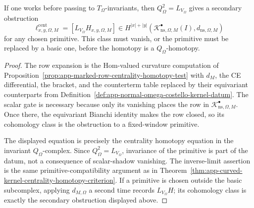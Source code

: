 \begin{prop}
  If one works before passing to \(T_\Omega\)-invariants, then
  \(Q_\Omega^2=L_{V_\Omega}\) gives a secondary obstruction
  \[
    \ell^{\mathrm{cent}}_{x,y,\Omega,M}
      =
    [L_{V_\Omega}H_{x,y,\Omega,M}]
      \in
    H^{|x|+|y|}
      (\mathcal K^\bullet_{\mathrm{ns},\Omega,M}(I),
       d_{\mathrm{ns},\Omega,M})
  \]
  for any chosen primitive.  This class must vanish, or the primitive
  must be replaced by a basic one, before the homotopy is a
  \(Q_\Omega\)-homotopy.
\end{prop}

\begin{proof}
  The row expansion is the Hom-valued curvature computation of
  Proposition~\ref{prop:app-marked-row-centrality-homotopy-test} with
  \(d_M\), the CE differential, the bracket, and the counterterm table
  replaced by their equivariant counterparts from
  Definition~\ref{def:app-normal-omega-costello-kernel-datum}.  The
  scalar gate is necessary because only its vanishing places the row in
  \(\mathcal K^\bullet_{\mathrm{ns},\Omega,M}\).  Once there, the
  equivariant Bianchi identity makes the row closed, so its cohomology
  class is the obstruction to a fixed-window primitive.

  The displayed equation is precisely the centrality homotopy equation in
  the invariant \(Q_\Omega\)-complex.  Since \(Q_\Omega^2=L_{V_\Omega}\),
  invariance of the primitive is part of the datum, not a consequence of
  scalar-shadow vanishing.  The inverse-limit assertion is the same
  primitive-compatibility argument as in
  Theorem~\ref{thm:app-curved-kernel-centrality-homotopy-criterion}.  If
  a primitive is chosen outside the basic subcomplex, applying
  \(d_{M,\Omega}\) a second time records \(L_{V_\Omega}H\); its
  cohomology class is exactly the secondary obstruction displayed above.
\end{proof}

